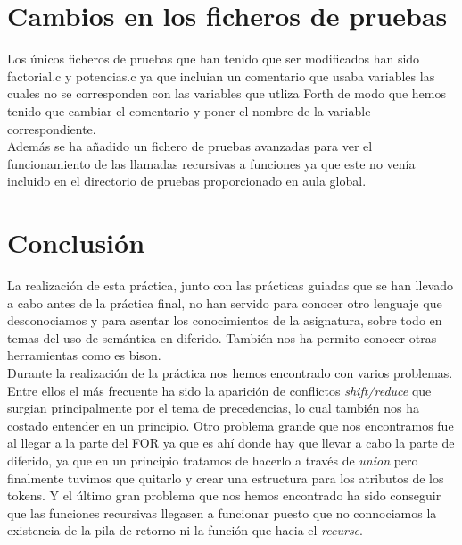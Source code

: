 \documentclass[11pt,spanish]{article}
\begin{document}
		
		
	\section{Cambios en los ficheros de pruebas}
	Los únicos ficheros de pruebas que han tenido que ser modificados han sido factorial.c y potencias.c ya que incluian un comentario que usaba variables las cuales no se corresponden con las variables que utliza Forth de modo que hemos tenido que cambiar el comentario y poner el nombre de la variable correspondiente.\\
	Además se ha añadido un fichero de pruebas avanzadas para ver el funcionamiento de las llamadas recursivas a funciones ya que este no venía incluido en el directorio de pruebas proporcionado en aula global.
	\section{Conclusión}
	La realización de esta práctica, junto con las prácticas guiadas que se han llevado a cabo antes de la práctica final, no han servido para conocer otro lenguaje que desconociamos y para asentar los conocimientos de la asignatura, sobre todo en temas del uso de semántica en diferido. También nos ha permito conocer otras herramientas como es bison.\\
	Durante la realización de la práctica nos hemos encontrado con varios problemas. Entre ellos el más frecuente ha sido la aparición de conflictos \textit {shift/reduce} que surgian principalmente por el tema de precedencias, lo cual también nos ha costado entender en un principio. Otro problema grande que nos encontramos fue al llegar a la parte del FOR ya que es ahí donde hay que llevar a cabo la parte de diferido, ya que en un principio tratamos de hacerlo a través de \textit {union} pero finalmente tuvimos que quitarlo y crear una estructura para los atributos de los tokens. Y el último gran problema que nos hemos encontrado ha sido conseguir que las funciones recursivas llegasen a funcionar puesto que no connociamos la existencia de la pila de retorno ni la función que hacia el \textit {recurse}.
	
\end{document}
